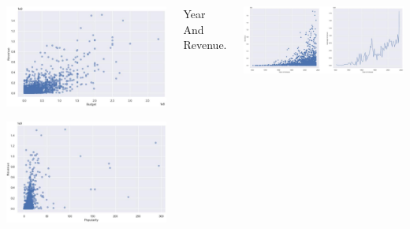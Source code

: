 \documentclass{tikzposter} %
\begin{document}
\begin{columns}
{\begin{center}    
    \begin{minipage}{0.45\linewidth}
    \centering
    \begin{tikzfigure}
      \includegraphics[width=0.9\linewidth]{figures/budget2.eps}
    \end{tikzfigure}%
    \end{minipage}
    \hfill
    \begin{minipage}{0.45\linewidth}
    \centering
    \begin{tikzfigure}
      \includegraphics[width=0.9\linewidth]{figures/popular2.eps}
    \end{tikzfigure}%
    \end{minipage}
\end{center}

		
\begin{description}

    \item 
    Year And Revenue.

\end{description}
\begin{tikzfigure}
  \includegraphics[width=0.8\linewidth]{figures/year2.eps}
 \end{tikzfigure}

}
\end{columns}
\end{document}

